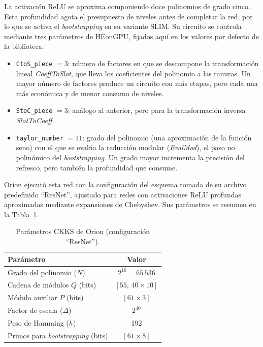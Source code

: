 La activación ReLU se aproxima componiendo doce polinomios de grado cinco. Esta profundidad agota el presupuesto de niveles antes de completar la red, por lo que se activa el \textit{bootstrapping} en su variante SLIM. Su circuito se controla mediante tres parámetros de HEonGPU, fijados aquí en los valores por defecto de la biblioteca:

\begin{itemize}
    \item \texttt{CtoS\_piece} $= 3$: número de factores en que se descompone la transformación lineal \textit{CoeffToSlot}, que lleva los coeficientes del polinomio a las ranuras. Un mayor número de factores produce un circuito con más etapas, pero cada una más económica y de menor consumo de niveles.
    \item \texttt{StoC\_piece} $= 3$: análogo al anterior, pero para la transformación inversa \textit{SlotToCoeff}.
    \item \texttt{taylor\_number} $= 11$: grado del polinomio (una aproximación de la función seno) con el que se evalúa la reducción modular (\textit{EvalMod}), el paso no polinómico del \textit{bootstrapping}. Un grado mayor incrementa la precisión del refresco, pero también la profundidad que consume.
\end{itemize}

Orion ejecutó esta red con la configuración del esquema tomada de su archivo predefinido ``ResNet'', ajustado para redes con activaciones ReLU profundas aproximadas mediante expansiones de Chebyshev. Sus parámetros se resumen en la \hyperref[tab:metodo_orion]{Tabla~\ref{tab:metodo_orion}}.

\begin{table}[h]
    \centering
    \caption{Parámetros CKKS de Orion (configuración ``ResNet'').}\label{tab:metodo_orion}
    \vspace{0.5em}
    \begin{tabular}{| l | c |}
        \hline
        Parámetro & Valor \\
        \hline
        Grado del polinomio ($N$) & $2^{16} = 65\,536$ \\
        \hline
        Cadena de módulos $Q$ (bits) & $[55,\, 40 \times 10]$ \\
        \hline
        Módulo auxiliar $P$ (bits) & $[61 \times 3]$ \\
        \hline
        Factor de escala ($\Delta$) & $2^{40}$ \\
        \hline
        Peso de Hamming ($h$) & 192 \\
        \hline
        Primos para \textit{bootstrapping} (bits) & $[61 \times 8]$ \\
        \hline
    \end{tabular}
\end{table}

